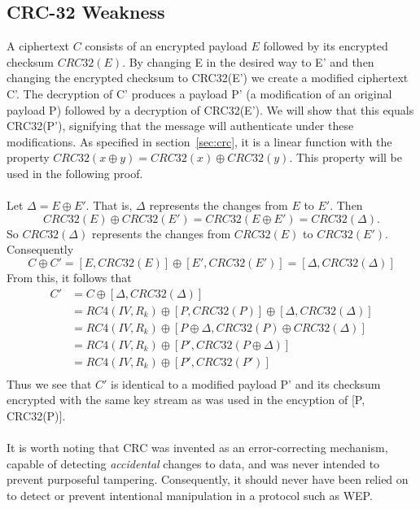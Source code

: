 \documentclass[12pt]{article}
\begin{document}
\subsection{CRC-32 Weakness}
A ciphertext $C$ consists of an encrypted payload $E$ followed by its encrypted checksum $CRC32(E)$.  By changing E in the desired way to E' and then changing the encrypted checksum to CRC32(E') we create a modified ciphertext C'.  The decryption of C' produces a payload P' (a modification of an original payload P) followed by a decryption of CRC32(E').  We will show that this equals CRC32(P'), signifying that the message will authenticate under these modifications.  As specified in section~\ref{sec:crc}, it is a linear function with the property $CRC32(x\oplus y)=CRC32(x)\oplus CRC32(y)$.  This property will be used in the following proof.
\\\\
Let $\Delta = E \oplus E'$.  That is, $\Delta$ represents the changes from $E$ to $E'$.  Then
\[CRC32(E) \oplus CRC32(E') = CRC32(E \oplus E') = CRC32(\Delta).\]
So $CRC32(\Delta)$ represents the changes from $CRC32(E)$ to $CRC32(E')$. Consequently
\[C \oplus C' = [E,CRC32(E)] \oplus [E',CRC32(E')] = [\Delta , CRC32(\Delta)]\]
From this, it follows that
\begin{align*}
C' &= C \oplus [\Delta , CRC32(\Delta)]\\
   &= RC4(IV,R_k)\oplus [P,CRC32(P)]\oplus [\Delta , CRC32(\Delta)]\\
   &= RC4(IV,R_k)\oplus [P\oplus \Delta, CRC32(P)\oplus CRC32(\Delta)]\\
   &= RC4(IV,R_k)\oplus [P', CRC32(P\oplus \Delta)]\\
   &= RC4(IV,R_k)\oplus [P', CRC32(P')]\\
\end{align*}
Thus we see that $C'$ is identical to a modified payload P' and its checksum encrypted with the same key stream as was used in the encyption of [P, CRC32(P)].
\\\\
It is worth noting that CRC was invented as an error-correcting mechanism, capable of detecting \textit{accidental} changes to data, and was never intended to prevent purposeful tampering.  Consequently, it should never have been relied on to detect or prevent intentional manipulation in a protocol such as WEP.
\end{document}
